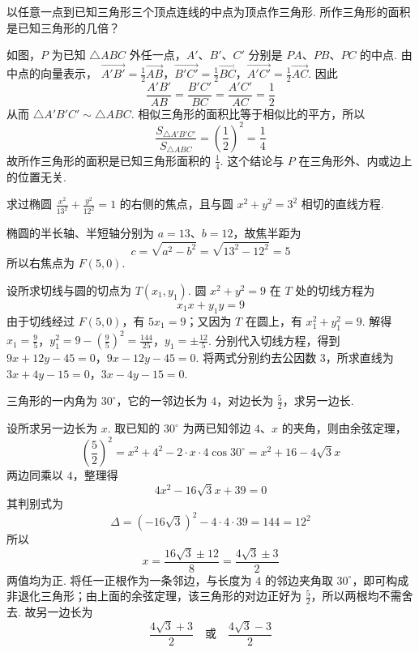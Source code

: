 \begin{problem}
以任意一点到已知三角形三个顶点连线的中点为顶点作三角形. 所作三角形的面积是已知三角形的几倍？
\end{problem}

\begin{solution}
如图，\(P\) 为已知 \(\triangle ABC\) 外任一点，\(A'\)、\(B'\)、\(C'\) 分别是 \(PA\)、\(PB\)、\(PC\) 的中点.
由中点的向量表示，
\(\overrightarrow{A'B'}=\frac{1}{2}\overrightarrow{AB}\)，\(\overrightarrow{B'C'}=\frac{1}{2}\overrightarrow{BC}\)，\(\overrightarrow{A'C'}=\frac{1}{2}\overrightarrow{AC}\).
因此
\[
\frac{A'B'}{AB}=\frac{B'C'}{BC}=\frac{A'C'}{AC}=\frac{1}{2}
\]
从而 \(\triangle A'B'C'\sim\triangle ABC\). 相似三角形的面积比等于相似比的平方，所以
\[
\frac{S_{\triangle A'B'C'}}{S_{\triangle ABC}}=\left(\frac{1}{2}\right)^2=\frac{1}{4}
\]
故所作三角形的面积是已知三角形面积的 \(\frac{1}{4}\). 这个结论与 \(P\) 在三角形外、内或边上的位置无关.
\end{solution}

\begin{problem}
求过椭圆 \( \frac{x^2}{13^2}+\frac{y^2}{12^2}=1 \) 的右侧的焦点，且与圆 \( x^2+y^2=3^2 \) 相切的直线方程.
\end{problem}

\begin{solution}
椭圆的半长轴、半短轴分别为 \(a=13\)、\(b=12\)，故焦半距为
\[
c=\sqrt{a^2-b^2}=\sqrt{13^2-12^2}=5
\]
所以右焦点为 \(F(5,0)\).

设所求切线与圆的切点为 \(T(x_1,y_1)\). 圆 \(x^2+y^2=9\) 在 \(T\) 处的切线方程为
\[
x_1x+y_1y=9
\]
由于切线经过 \(F(5,0)\)，有 \(5x_1=9\)；又因为 \(T\) 在圆上，有 \(x_1^2+y_1^2=9\). 解得
\(x_1=\frac{9}{5}\)，\(y_1^2=9-\left(\frac{9}{5}\right)^2=\frac{144}{25}\)，\(y_1=\pm\frac{12}{5}\).
分别代入切线方程，得到
\(9x+12y-45=0\)，\(9x-12y-45=0\).
将两式分别约去公因数 \(3\)，所求直线为
\(3x+4y-15=0\)，\(3x-4y-15=0\).
\end{solution}

\begin{problem}
三角形的一内角为 \( 30^\circ \)，它的一邻边长为 \( 4 \)，对边长为 \( \frac{5}{2} \)，求另一边长.
\end{problem}

\begin{solution}
设所求另一边长为 \(x\). 取已知的 \(30^\circ\) 为两已知邻边 \(4\)、\(x\) 的夹角，则由余弦定理，
\[
\left(\frac{5}{2}\right)^2=x^2+4^2-2\cdot x\cdot4\cos30^\circ=x^2+16-4\sqrt{3}x
\]
两边同乘以 \(4\)，整理得
\[
4x^2-16\sqrt{3}x+39=0
\]
其判别式为
\[
\Delta=\left(-16\sqrt{3}\right)^2-4\cdot4\cdot39=144=12^2
\]
所以
\[
x=\frac{16\sqrt{3}\pm12}{8}=\frac{4\sqrt{3}\pm3}{2}
\]
两值均为正. 将任一正根作为一条邻边，与长度为 \(4\) 的邻边夹角取 \(30^\circ\)，即可构成非退化三角形；由上面的余弦定理，该三角形的对边正好为 \(\frac{5}{2}\)，所以两根均不需舍去. 故另一边长为
\[
\frac{4\sqrt{3}+3}{2}\quad\text{或}\quad\frac{4\sqrt{3}-3}{2}
\]
\end{solution}

